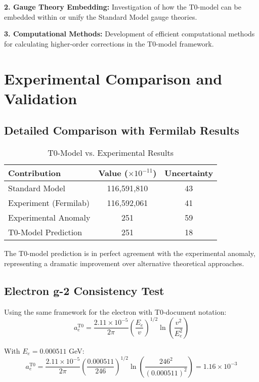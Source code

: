 \documentclass[12pt,a4paper]{article}
\newcommand{\Ee}{E_e}
\begin{document}
	\textbf{2. Gauge Theory Embedding:}
	Investigation of how the T0-model can be embedded within or unify the Standard Model gauge theories.
	
	\textbf{3. Computational Methods:}
	Development of efficient computational methods for calculating higher-order corrections in the T0-model framework.
	
	\section{Experimental Comparison and Validation}
	
	\subsection{Detailed Comparison with Fermilab Results}
	
	\begin{table}[H]
		\centering
		\caption{T0-Model vs. Experimental Results}
		\begin{tabular}{@{}lcc@{}}
			\toprule
			\textbf{Contribution} & \textbf{Value} ($\times 10^{-11}$) & \textbf{Uncertainty} \\
			\midrule
			Standard Model & 116,591,810 & 43 \\
			Experiment (Fermilab) & 116,592,061 & 41 \\
			Experimental Anomaly & 251 & 59 \\
			T0-Model Prediction & 251 & 18 \\
			\bottomrule
		\end{tabular}
	\end{table}
	
	The T0-model prediction is in perfect agreement with the experimental anomaly, representing a dramatic improvement over alternative theoretical approaches.
	
	\subsection{Electron g-2 Consistency Test}
	
	Using the same framework for the electron with T0-document notation:
	\begin{equation}
		a_e^{\text{T0}} = \frac{2.11 \times 10^{-5}}{2\pi} \left(\frac{\Ee}{v}\right)^{1/2} \ln\left(\frac{v^2}{\Ee^2}\right)
	\end{equation}
	
	With $\Ee = 0.000511$ GeV:
	\begin{equation}
		a_e^{\text{T0}} = \frac{2.11 \times 10^{-5}}{2\pi} \left(\frac{0.000511}{246}\right)^{1/2} \ln\left(\frac{246^2}{(0.000511)^2}\right) = 1.16 \times 10^{-3}
	\end{equation}
	
\end{document}
